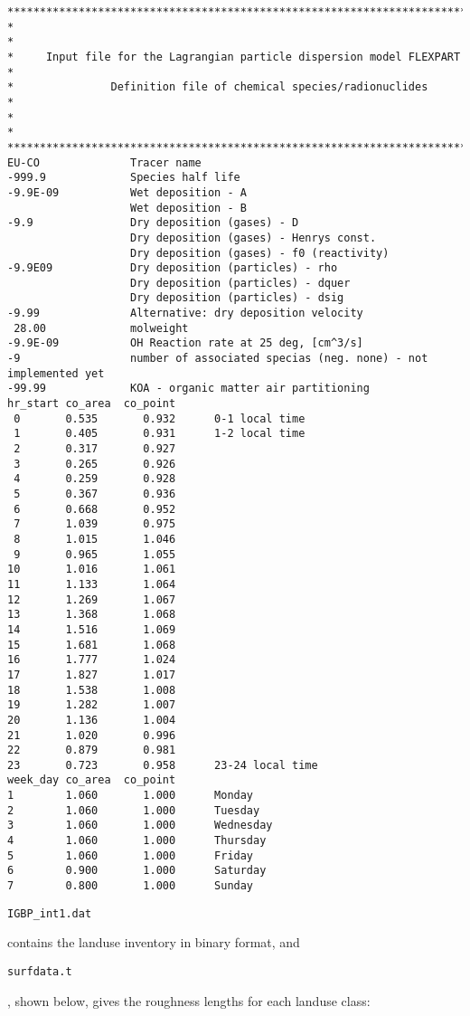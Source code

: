 \documentclass{egu}                  %
\begin{document}
\begin{scriptsize}\begin{verbatim}
****************************************************************************
*                                                                          *
*     Input file for the Lagrangian particle dispersion model FLEXPART     *
*               Definition file of chemical species/radionuclides          *
*                                                                          *
****************************************************************************
EU-CO              Tracer name
-999.9             Species half life
-9.9E-09           Wet deposition - A
                   Wet deposition - B
-9.9               Dry deposition (gases) - D
                   Dry deposition (gases) - Henrys const.
                   Dry deposition (gases) - f0 (reactivity)
-9.9E09            Dry deposition (particles) - rho
                   Dry deposition (particles) - dquer
                   Dry deposition (particles) - dsig
-9.99              Alternative: dry deposition velocity
 28.00             molweight
-9.9E-09           OH Reaction rate at 25 deg, [cm^3/s]
-9                 number of associated specias (neg. none) - not implemented yet
-99.99             KOA - organic matter air partitioning
hr_start co_area  co_point
 0       0.535       0.932      0-1 local time
 1       0.405       0.931      1-2 local time
 2       0.317       0.927
 3       0.265       0.926
 4       0.259       0.928
 5       0.367       0.936
 6       0.668       0.952
 7       1.039       0.975
 8       1.015       1.046
 9       0.965       1.055
10       1.016       1.061
11       1.133       1.064
12       1.269       1.067
13       1.368       1.068
14       1.516       1.069
15       1.681       1.068
16       1.777       1.024
17       1.827       1.017
18       1.538       1.008
19       1.282       1.007
20       1.136       1.004
21       1.020       0.996
22       0.879       0.981
23       0.723       0.958      23-24 local time
week_day co_area  co_point
1        1.060       1.000      Monday
2        1.060       1.000      Tuesday
3        1.060       1.000      Wednesday
4        1.060       1.000      Thursday
5        1.060       1.000      Friday
6        0.900       1.000      Saturday
7        0.800       1.000      Sunday
\end{verbatim}\end{scriptsize}

\begin{footnotesize}\verb|IGBP_int1.dat|\end{footnotesize} contains the landuse inventory in binary format, and
\begin{footnotesize}\verb|surfdata.t|\end{footnotesize}, shown below, gives the roughness lengths for each landuse class:
\end{document}
